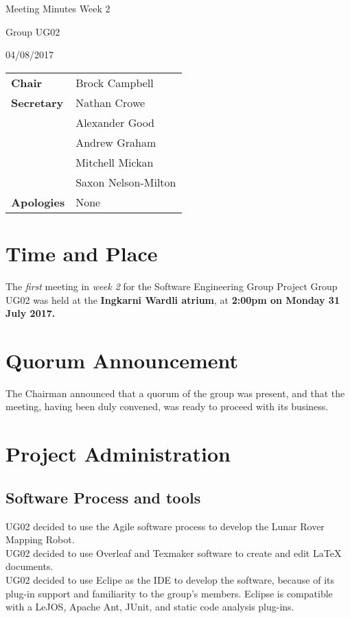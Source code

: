 \documentclass[11pt, a4paper]{article}
\begin{document}
\begin{center}    
{\huge Meeting Minutes Week 2 \par}
\vspace{0.5cm}
{\large Group UG02 \par}
\vspace{0.5cm}
{\large 04/08/2017 \par}
\vspace{0.5cm}
\end{center}

\begin{flushleft}
\begin{tabular}{ll}
{\bfseries Chair} & Brock Campbell \\
{\bfseries Secretary} & Nathan Crowe \\
 & Alexander Good \\
 & Andrew Graham \\
 & Mitchell Mickan \\
 & Saxon Nelson-Milton \\
{\bfseries Apologies} & None\\
\end{tabular}
\end{flushleft}

\section{Time and Place}
	The {\itshape first} meeting in {\itshape week 2} for the Software Engineering Group Project Group UG02 was held at the {\bfseries Ingkarni Wardli atrium}, at {\bfseries 2:00pm on Monday 31 July 2017.} 
	
\section{Quorum Announcement}
	The Chairman announced that a quorum of the group was present, and that the meeting, having been duly convened, was ready to proceed with its business.	
	
\section{Project Administration}
	\subsection{Software Process and tools}
	UG02 decided to use the Agile software process to develop the Lunar Rover Mapping Robot. \\
	UG02 decided to use Overleaf and Texmaker software to create and edit LaTeX documents. \\
	UG02 decided to use Eclipe as the IDE to develop the software, because of its plug-in support and familiarity to the group's members. Eclipse is compatible with a LeJOS, Apache Ant, JUnit, and static code analysis plug-ins.
		
\end{document}
